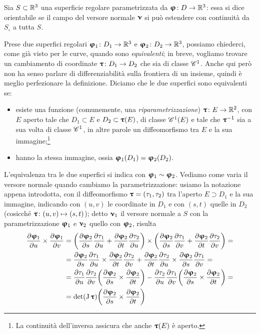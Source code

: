 \begin{definizione} \label{d:superficie-orientabile}
	Sia $S\subset\R^3$ una superficie regolare parametrizzata da $\vphi\colon D\to\R^3$: essa si dice orientabile se il campo del versore normale $\vnu$ si può estendere con continuità da $S_\circ$ a tutta $S$.
\end{definizione}
Prese due superfici regolari $\vphi_1\colon D_1\to\R^3$ e $\vphi_2\colon D_2\to\R^3$, possiamo chiederci, come già visto per le curve, quando sono \emph{equivalenti}; in breve, vogliamo trovare un cambiamento di coordinate $\vtau\colon D_1\to D_2$ che sia di classe $\cclass[1]$.
Anche qui però non ha senso parlare di differenziabilità sulla frontiera di un insieme, quindi è meglio perfezionare la definizione.
Diciamo che le due superfici sono equivalenti se:
\begin{itemize}
	\item esiste una funzione (comunemente, una \emph{riparametrizzazione}) $\vtau\colon E\to\R^2$, con $E$ aperto tale che $D_1\subset E$ e $D_2\subset\vtau(E)$, di classe $\cont[1]{E}$ e tale che $\vtau^{-1}$ sia a sua volta di classe $\cclass[1]$, in altre parole un diffeomorfismo tra $E$ e la sua immagine;\footnote{
		La continuità dell'inversa assicura che anche $\vtau(E)$ è aperto.
	}
	\item hanno la stessa immagine, ossia $\vphi_1(D_1)=\vphi_2(D_2)$. 
\end{itemize}

L'equivalenza tra le due superfici si indica con $\vphi_1\sim\vphi_2$.
Vediamo come varia il versore normale quando cambiamo la parametrizzazione: usiamo la notazione appena introdotta, con il diffeomorfismo $\vtau=(\tau_1,\tau_2)$ tra l'aperto $E\supset D_1$ e la sua immagine, indicando con $(u,v)$ le coordinate in $D_1$ e con $(s,t)$ quelle in $D_2$ (cosicch\'e $\vtau\colon(u,v)\mapsto(s,t)$); detto $\vnu_1$ il versore normale a $S$ con la parametrizzazione $\vphi_1$ e $\vnu_2$ quello con $\vphi_2$, risulta
\begin{equation}
	\begin{split}
		\drp{\vphi_1}{u}\times\drp{\vphi_1}{v}&=\bigg(\drp{\vphi_2}{s}\drp{\tau_1}{u}+\drp{\vphi_2}{t}\drp{\tau_2}{u}\bigg)\times\bigg(\drp{\vphi_2}{s}\drp{\tau_1}{v}+\drp{\vphi_2}{t}\drp{\tau_2}{v}\bigg)=\\
		&=\drp{\vphi_2}{s}\drp{\tau_1}{u}\times\drp{\vphi_2}{t}\drp{\tau_2}{v}+\drp{\vphi_2}{t}\drp{\tau_2}{u}\times\drp{\vphi_2}{s}\drp{\tau_1}{v}=\\
		&=\drp{\tau_1}{u}\drp{\tau_2}{v}\bigg(\drp{\vphi_2}{s}\times\drp{\vphi_2}{t}\bigg)-\drp{\tau_2}{u}\drp{\tau_1}{v}\bigg(\drp{\vphi_2}{s}\times\drp{\vphi_2}{t}\bigg)=\\
		&=\det(\jac\vtau)\bigg(\drp{\vphi_2}{s}\times\drp{\vphi_2}{t}\bigg)
	\end{split}
\end{equation}
